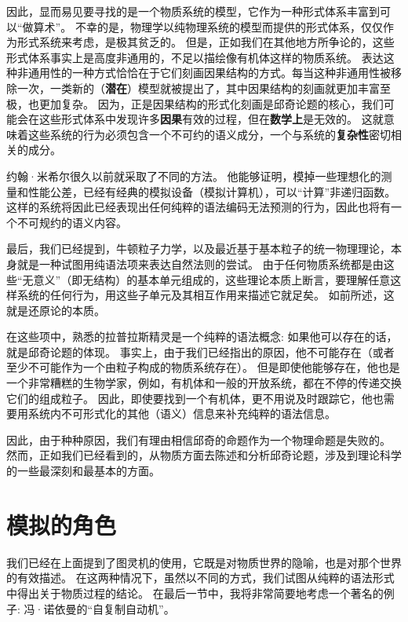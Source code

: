 \documentclass[a4paper,12pt]{article}
\begin{document}
因此，显而易见要寻找的是一个\gls{物质系统}的\gls{模型}，它作为一种形式体系丰富到可以“做算术”。
不幸的是，物理学以纯物理系统的\gls{模型}而提供的形式体系，仅仅作为\gls{形式系统}来考虑，是极其贫乏的。
但是，正如我们在其他地方所争论的，这些形式体系事实上是高度非通用的，不足以描绘像有机体这样的\gls{物质系统}\cite{RosenRinpress}。
表达这种非通用性的一种方式恰恰在于它们刻画\gls{因果结构}的方式。每当这种非通用性被移除一次，一类新的（\textbf{潜在}）\gls{模型}就被提出了，其中\gls{因果结构}的刻画就更加丰富至极，也更加复杂。
因为，正是\gls{因果结构}的\gls{形式化}刻画是\gls{邱奇论题}的核心，我们可能会在这些形式体系中发现许多\textbf{\gls{因果}}有效的过程，但在\textbf{数学上}是无效的。
这就意味着这些系统的行为必须包含一个不可约的\gls{语义成分}，一个与系统的\textbf{复杂性}密切相关的成分。

约翰·米希尔很久以前就采取了不同的方法\cite{MyhillJ1966}。
他能够证明，模掉一些理想化的\gls{测量}和性能公差，已经有经典的\gls{模拟设备}（\gls{模拟计算机}），可以“计算”非递归函数。
这样的系统将因此已经表现出任何纯粹的\gls{语法编码}无法\gls{预测}的行为，因此也将有一个不可规约的\gls{语义内容}。

最后，我们已经提到，牛顿粒子力学，以及最近基于基本粒子的统一物理理论，本身就是一种试图用纯\gls{语法项}来表达\gls{自然法则}的尝试。
由于任何\gls{物质系统}都是由这些“无意义”（即无结构）的基本单元组成的，这些理论本质上断言，要理解任意这样系统的任何行为，用这些子单元及其相互作用来描述它就足矣。
如前所述，这就是还原论的本质。

在这些项中，熟悉的拉普拉斯精灵是一个纯粹的\gls{语法}概念: 如果他可以存在的话，就是\gls{邱奇论题}的体现。
事实上，由于我们已经指出的原因，他不可能存在（或者至少不可能作为一个由粒子构成的\gls{物质系统}存在）。
但是即使他能够存在，他也是一个非常糟糕的生物学家，例如，有机体和一般的开放系统，都在不停的传递交换它们的组成粒子。
因此，即使要找到一个有机体，更不用说及时跟踪它，他也需要用系统内不可\gls{形式化}的其他（\gls{语义}）信息来补充纯粹的\gls{语法信息}。

因此，由于种种原因，我们有理由相信邱奇的\gls{命题}作为一个\gls{物理命题}是失败的。
然而，正如我们已经看到的，从\gls{物质}方面去陈述和分析\gls{邱奇论题}，涉及到理论科学的一些最深刻和最基本的方面。

\section{模拟的角色}

我们已经在上面提到了\gls{图灵机}的使用，它既是对\gls{物质世界}的隐喻，也是对那个世界的有效描述。
在这两种情况下，虽然以不同的方式，我们试图从纯粹的\gls{语法形式}中得出关于\gls{物质过程}的结论。
在最后一节中，我将非常简要地考虑一个著名的例子: 冯·诺依曼的“自复制自动机”\cite{BurksA1966}\cite{ArbibMA1988}。
\end{document}
